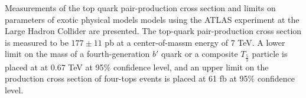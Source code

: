 %

Measurements of the top quark pair-production cross section and limits on parameters of exotic physical models models using the ATLAS experiment at the Large Hadron Collider are presented.
The top-quark pair-production cross section is measured to be $177 \pm 11$ pb at a center-of-massm energy of 7 TeV.
A lower limit on the mass of a fourth-generation $b'$ quark or a composite $T_{\frac{5}{3}}$ particle is placed at at 0.67 TeV at 95\% confidence level, and an upper limit on the production cross section of four-tops events is placed at 61 fb at 95\% confidence level.


